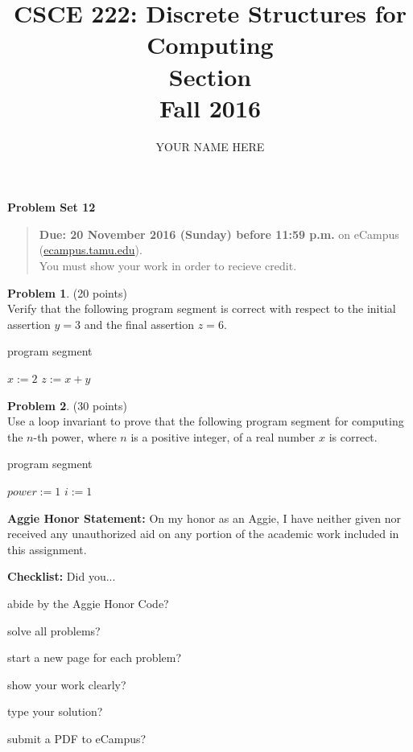 \documentclass{article}
\title{CSCE 222: Discrete Structures for Computing\\Section \mysectionnumber\\Fall 2016}
\author{YOUR NAME HERE}
\theoremstyle{definition}
\newtheorem{problem}{Problem}
\newtheorem*{solution}{Solution}
\newcommand{\honor}{\noindent \textbf{Aggie Honor Statement: }On my honor as an Aggie, I have neither
  given nor received any unauthorized aid on any portion of the academic work included in this assignment.
}
\newcommand{\checklist}{\noindent\textbf{Checklist:}
Did you...
\begin{compactenum}
\item abide by the Aggie Honor Code?
\item solve all problems?
\item start a new page for each problem?
\item show your work clearly?
\item type your solution?
\item submit a PDF to eCampus?
\end{compactenum}
}
\newcommand{\problemset}[1]{\begin{center}\textbf{Problem Set #1}\end{center}}
\newcommand{\duedate}[1]{\begin{quote}\textbf{Due: #1} on eCampus (\url{ecampus.tamu.edu}). \\You must show your work in order to recieve credit.\end{quote}}
\begin{document}
\maketitle

\problemset{12}

\duedate{20 November 2016 (Sunday) before 11:59 p.m.}

\bigskip

\begin{problem} (20 points)\\
Verify that the following program segment is correct with respect to the initial assertion $y=3$ and the final assertion $z=6$.
\begin{algorithm}
\DontPrintSemicolon
\caption{program segment}
$x := 2$\;
$z := x + y$\;
\end{algorithm}
\end{problem}



\begin{problem} (30 points)\\
Use a loop invariant to prove that the following program segment for computing the $n$-th power, where $n$ is a positive integer, of a real number $x$ is correct.
\begin{algorithm}
\caption{program segment}
\DontPrintSemicolon
$power := 1$\;
$i := 1$\;
\end{algorithm}
\end{problem}




\bigskip
\honor

\bigskip
\checklist
\end{document}

